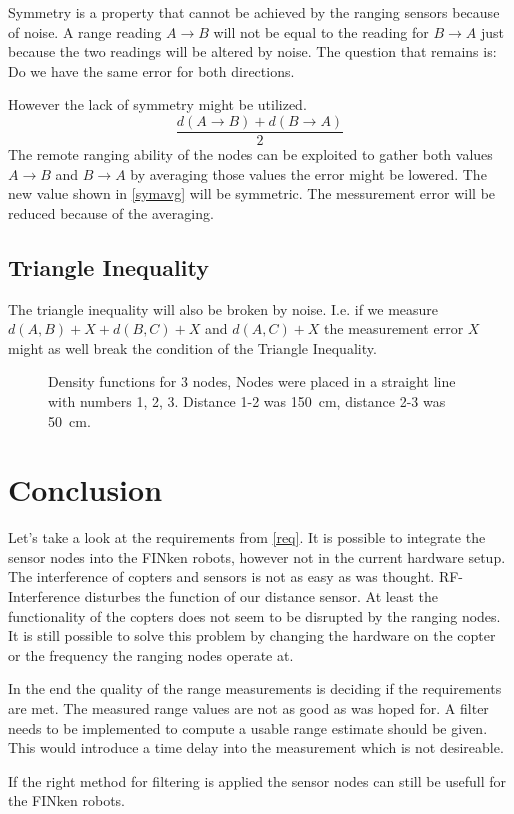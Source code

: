 Symmetry is a property that cannot be achieved by the ranging sensors because of noise. 
A range reading $A \rightarrow B$ will not be equal to the reading for $B \rightarrow A$ just because the two readings will be altered by noise.
The question that remains is: Do we have the same error for both directions.



However the lack of symmetry might be utilized.
\begin{equation}
\frac{ d(A \rightarrow B) + d(B \rightarrow A) }{2}
\label{symavg}
\end{equation}
The remote ranging ability of the nodes can be exploited to gather both values $A \rightarrow B$ and $B \rightarrow A$ by averaging those values the error might be lowered. 
The new value shown in \autoref{symavg} will be symmetric.
The messurement error will be reduced because of the averaging.

\subsection{Triangle Inequality}
The triangle inequality will also be broken by noise.
I.e. if we measure $d(A,B) + X + d(B,C) + X$ and $d(A, C) + X$ the measurement error $X$ might as well break the condition of the Triangle Inequality.

\begin{figure}[H]
	\centering
	
	\caption[Density functions for 3 nodes]{Density functions for 3 nodes, Nodes were placed in a straight line with numbers 1, 2, 3. Distance 1-2 was \SI{150}{cm}, distance 2-3 was \SI{50}{cm}. }
	\label{triangle}
\end{figure}


\section{Conclusion}

Let's take a look at the requirements from \autoref{req}.
It is possible to integrate the sensor nodes into the FINken robots, however not in the current hardware setup.
The interference of copters and sensors is not as easy as was thought.
RF-Interference disturbes the function of our distance sensor.
At least the functionality of the copters does not seem to be disrupted by the ranging nodes.
It is still possible to solve this problem by changing the hardware on the copter or the frequency the ranging nodes operate at.

In the end the quality of the range measurements is deciding if the requirements are met.
The measured range values are not as good as was hoped for.
A filter needs to be implemented to compute a usable range estimate should be given.
This would introduce a time delay into the measurement which is not desireable. 

If the right method for filtering is applied the sensor nodes can still be usefull for the FINken robots.
